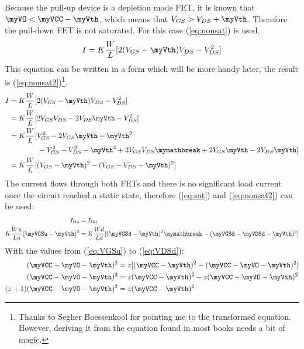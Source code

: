 Because the pull-up device is a depletion mode FET, it is known that
$\myVO < \myVCC - \myVth$, which means that $V_{GS} > V_{DS} + \myVth$.
Therefore the pull-down FET is not saturated. For this case (\ref{eq:nonsat})
is used.
\begin{equation}
\label{eq:nonsat}
I = K \frac{W}{L} [ 2 (V_{GS} - \myVth) V_{DS} - V_{DS}^2 ]
\end{equation}
This equation can be written in a form which will be more handy later, the
result is (\ref{eq:nonsat2})\footnote{Thanks to Segher Boessenkool for pointing
me to the transformed equation. However, deriving it from the equation found
in most books needs a bit of magic.}.
\tabletextsize
\begin{align}
I &= K \frac{W}{L} [ 2 (V_{GS} - \myVth) V_{DS} - V_{DS}^2 ] \notag \\
  &= K \frac{W}{L} [ 2 V_{GS} V_{DS} - 2 V_{DS} \myVth - V_{DS}^2 ] \notag \\
  &= K \frac{W}{L} [ V_{GS}^2 - 2 V_{GS} \myVth + \myVth^2 \notag \\
  &    \qquad \qquad - V_{GS}^2 - V_{DS}^2 - \myVth^{2} + 2 V_{GS} V_{DS}
        \mymathbreak + 2 V_{GS} \myVth - 2 V_{DS} \myVth ] \notag \\
\label{eq:nonsat2}
  &= K \frac{W}{L} [ (V_{GS} - \myVth)^2 - (V_{GS} - V_{DS} - \myVth)^2 ]
\end{align}
\normalsize
The current flows through both FETs and there is no significant load current
once the circuit reached a static state, therefore (\ref{eq:sat}) and
(\ref{eq:nonsat2}) can be used:
\tabletextsize
\begin{align*}
    I_\mathrm{Du} &= I_\mathrm{Dd} \\
    K \frac{Wu}{Lu} (\myVGSu - \myVth)^2 &=
                    K \frac{Wd}{Ld} [ (\myVGSd - \myVth)^2
                    \mymathbreak - (\myVGSd - \myVDSd - \myVth)^2 ] \\
\end{align*}
\normalsize
With the values from (\ref{eq:VGSu}) to (\ref{eq:VDSd}):
\tabletextsize
\begin{align*}
    (\myVCC - \myVO - \myVth)^2 &=
                    z [ (\myVCC - \myVth)^2 - (\myVCC - \myVO - \myVth)^2 ] \\
    (\myVCC - \myVO - \myVth)^2 &=
                    z (\myVCC - \myVth)^2 - z (\myVCC - \myVO - \myVth)^2 \\
    (z+1) (\myVCC - \myVO - \myVth)^2 &=
                    z (\myVCC - \myVth)^2
\end{align*}
\normalsize

